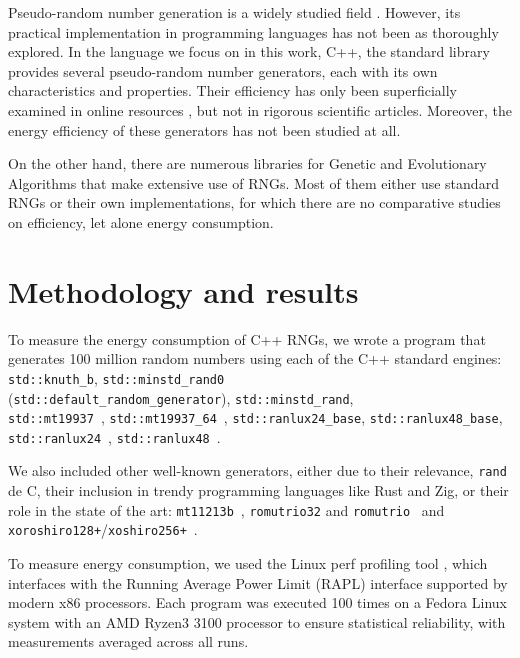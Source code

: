 \documentclass[dvipsnames,format=sigconf,anonymous=true,review=true]{acmart}
\begin{document}
Pseudo-random number generation is a widely studied field \cite{marsaglia2003random}. However, its practical implementation in programming languages has not been as thoroughly explored. In the language we focus on in this work, C++, the standard library provides several pseudo-random number generators, each with its own characteristics and properties. Their efficiency has only been superficially examined in online resources \cite{kd9f9-2020,arbelaez-2016}, but not in rigorous scientific articles. Moreover, the energy efficiency of these generators has not been studied at all.

On the other hand, there are numerous libraries for Genetic and Evolutionary Algorithms \cite{wall1996galib, keijzer2001evolving, levine1996users} that make extensive use of RNGs. Most of them either use standard RNGs or their own implementations, for which there are no comparative studies on efficiency, let alone energy consumption.

\section{Methodology and results}
\label{sec:methodology}

To measure the energy consumption of C++ RNGs, we wrote a program that generates 100 million random numbers using each of the C++ standard engines: \texttt{std::knuth\_b},  \texttt{std::minstd\_rand0} \\(\texttt{std::default\_random\_generator}),  \texttt{std::minstd\_rand}, \\ \texttt{std::mt19937}~\cite{mersennetwister},  \texttt{std::mt19937\_64}~\cite{mersennetwister}, \texttt{std::ranlux24\_base}, \texttt{std::ranlux48\_base},  \texttt{std::ranlux24}~\cite{JAMES1994111}, \texttt{std::ranlux48}~\cite{JAMES1994111}.

We also included other well-known generators, either due to their relevance, \texttt{rand} de C, their inclusion in trendy programming languages like Rust and Zig, or their role in the state of the art: \texttt{mt11213b}~\cite{mersennetwister}, \texttt{romutrio32} and \texttt{romutrio}~\cite{overton2020romufastnonlinearpseudorandom} and \texttt{xoroshiro128+}/\-\texttt{xoshiro256+}~\cite{blackman2021scrambled}.

To measure energy consumption, we used the Linux perf profiling tool \cite{perf}, which interfaces with the Running Average Power Limit (RAPL) interface \cite{rapl} supported by modern x86 processors. Each program was executed 100 times on a Fedora Linux system with an AMD Ryzen3 3100 processor to ensure statistical reliability, with measurements averaged across all runs.
\end{document}
